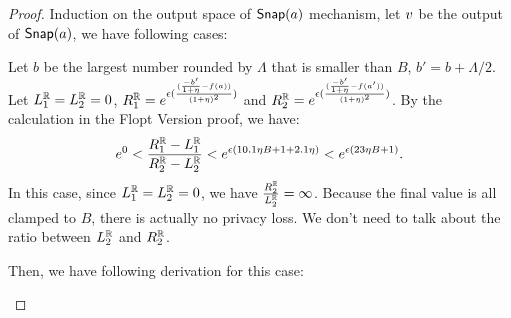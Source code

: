 \documentclass[a4paper,11pt]{article}
\begin{document}
\begin{thm}
\end{thm}
\begin{proof}
Induction on the output space of $\mathsf{Snap}(a)$ mechanism, let $v$ be the output of $\mathsf{Snap}(a)$, we have following cases:
\begin{itemize}
%
Let $b$ be the largest number rounded by $\Lambda$ that is smaller than $B$, $b' = b + \Lambda / 2$.
%
\\
Let $L^{\mathbb{R}}_1 = L^{\mathbb{R}}_2 = 0$, 
$R^{\mathbb{R}}_1 = e^{\epsilon 
		(\frac{(\frac{-b'}{1 + \eta} - f(a))}{(1 + \eta)^2})}$
and $R^{\mathbb{R}}_2 = e^{\epsilon 
		(\frac{(\frac{-b'}{1 + \eta} - f(a'))}{(1 + \eta)^2})}$.
By the calculation in the Flopt Version proof, we have:
\[
	e^0 < \frac{R^{\mathbb{R}}_1 - L^{\mathbb{R}}_1}{R^{\mathbb{R}}_2 - L^{\mathbb{R}}_2}
	< e^{\epsilon(10.1 \eta B + 1 + 2.1\eta)} 
	< e^{\epsilon(23 \eta B + 1)}.
\]
%
In this case, since $L^{\mathbb{R}}_1 = L^{\mathbb{R}}_2 = 0$, we have $\frac{R^{\mathbb{R}}_2}{L^{\mathbb{R}}_2} = \infty$. 
Because the final value is all clamped to $B$, there is actually no privacy loss.
We don’t need to talk about the ratio between $L^{\mathbb{R}}_2$ and $R^{\mathbb{R}}_2$.

Then, we have following derivation for this case:


\end{itemize}
\end{proof}
\end{document}

